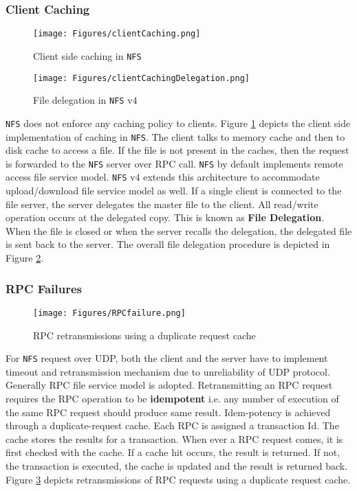 \documentclass[twoside]{article}
\begin{document}
\subsubsection{Client Caching}
\begin{figure}[htbp]
\centering
\texttt{[image: Figures/clientCaching.png]}
\caption{Client side caching in \texttt{NFS}} \label{cc}
\end{figure}
\begin{figure}[htbp]
\centering
\texttt{[image: Figures/clientCachingDelegation.png]}
\caption{File delegation in \texttt{NFS} v$4$} \label{cc2}
\end{figure}
\texttt{NFS} does not enforce any caching policy to clients. Figure \ref{cc} depicts the client side implementation of caching in \texttt{NFS}. The client talks to memory cache and then to disk cache to access a file. If the file is not present in the caches, then the request is forwarded to the \texttt{NFS} server over RPC call. \texttt{NFS} by default implements remote access file service model. \texttt{NFS} v$4$ extends this architecture to accommodate upload/download file service model as well. If a single client is connected to the file server, the server delegates the master file to the client. All read/write operation occurs at the delegated copy. This is known as {\bf File Delegation}. When the file is closed or when the server recalls the delegation, the delegated file is sent back to the server. The overall file delegation procedure is depicted in Figure \ref{cc2}.
\subsubsection{RPC Failures}

\begin{figure}[htbp]
\centering
\texttt{[image: Figures/RPCfailure.png]}
\caption{RPC retransmissions using a duplicate request cache} \label{rpcf}
\end{figure}
For \texttt{NFS} request over UDP, both the client and the server have to implement timeout and retransmission mechanism due to unreliability of UDP protocol. Generally RPC file service model is adopted. Retransmitting an RPC request requires the RPC operation to be {\bf idempotent} i.e. any number of execution of the same RPC request should produce same result. Idem-potency is achieved through a duplicate-request cache. Each RPC is assigned a transaction Id. The cache stores the results for a transaction. When ever a RPC request comes, it is first checked with the cache. If a cache hit occurs, the result is returned. If not, the transaction is executed, the cache is updated and the result is returned back. Figure \ref{rpcf} depicts retransmissions of RPC requests using a duplicate request cache.
\end{document}
